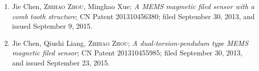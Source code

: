   \begin{enumerate}
    \item Jie Chen, \textsc{Zhihao Zhou}, Minghao Xue; \textit{A MEMS magmetic filed sensor with a comb tooth structure}; CN Patent 201310456380; filed September 30, 2013, and issued September 9, 2015.
    \item Jie Chen, Qiushi Liang, \textsc{Zhihao Zhou}; \textit{A dual-torsion-pendulum type MEMS magnetic filed sensor}; CN Patent 201310455985; filed September 30, 2013, and issued September 23, 2015.
  \end{enumerate}
